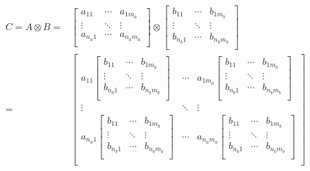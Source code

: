\begin{align*}
    C = A \otimes B =
    &\begin{bmatrix}
        a_{11} & \cdots & a_{1m_a} \\
        \vdots & \ddots  & \vdots \\
        a_{n_a1} & \cdots  & a_{n_am_a} \\
    \end{bmatrix}
    \otimes
    \begin{bmatrix}
        b_{11} & \cdots & b_{1m_b} \\
        \vdots & \ddots  & \vdots \\
        b_{n_b1} & \cdots  & b_{n_bm_b} \\
    \end{bmatrix} \\[0.5cm]
    =
    &\begin{bmatrix}
        a_{11}\begin{bmatrix}
            b_{11} & \cdots & b_{1m_b} \\
            \vdots & \ddots  & \vdots \\
            b_{n_b1} & \cdots  & b_{n_bm_b} \\
        \end{bmatrix} 
        & \cdots & a_{1m_a}\begin{bmatrix}
            b_{11} & \cdots & b_{1m_b} \\
            \vdots & \ddots  & \vdots \\
            b_{n_b1} & \cdots  & b_{n_bm_b} \\
        \end{bmatrix}
         \\
        \vdots & \ddots  & \vdots \\
        a_{n_a1}\begin{bmatrix}
            b_{11} & \cdots & b_{1m_b} \\
            \vdots & \ddots  & \vdots \\
            b_{n_b1} & \cdots  & b_{n_bm_b} \\
        \end{bmatrix} 
        & \cdots  & a_{n_am_a}\begin{bmatrix}
            b_{11} & \cdots & b_{1m_b} \\
            \vdots & \ddots  & \vdots \\
            b_{n_b1} & \cdots  & b_{n_bm_b} \\
        \end{bmatrix} \\

\end{bmatrix}
\end{align*}
